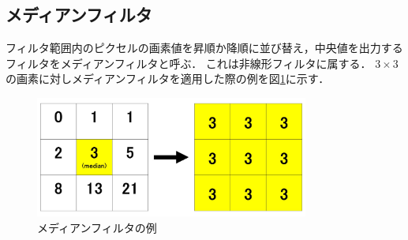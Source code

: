 \documentclass[openright]{nitocs}
\numberwithin{equation}{section}
\begin{document}
        \subsection{メディアンフィルタ}
            フィルタ範囲内のピクセルの画素値を昇順か降順に並び替え，中央値を出力するフィルタをメディアンフィルタと呼ぶ\cite{DIP}．
            これは非線形フィルタに属する．
            $3\times3$の画素に対しメディアンフィルタを適用した際の例を図\ref{medianBlur}に示す．

            \begin{figure}[tb] %
                \begin{center}
                \includegraphics[clip,width=90mm]{medianBlur.jpg} 
                \caption{メディアンフィルタの例}
                \label{medianBlur}
                \end{center}
            \end{figure}
\end{document}
